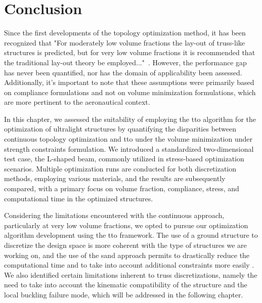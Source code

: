 \section{Conclusion}
Since the first developments of the topology optimization method, it has been recognized that "For moderately low volume fractions the lay-out of truss-like structures is predicted, but for very low volume fractions it is recommended that the traditional lay-out theory be employed..."~. However, the performance gap has never been quantified, nor has the domain of applicability been assessed. Additionally, it's important to note that these assumptions were primarily based on compliance formulations and not on volume minimization formulations, which are more pertinent to the aeronautical context.

In this chapter, we assessed the suitability of employing the \gls{tto} algorithm for the optimization of ultralight structures by quantifying the disparities between continuous topology optimization and \gls{tto} under the volume minimization under strength constraints formulation. We introduced a standardized two-dimensional test case, the L-shaped beam, commonly utilized in stress-based optimization scenarios. Multiple optimization runs are conducted for both discretization methods, employing various materials, and the results are subsequently compared, with a primary focus on volume fraction, compliance, stress, and computational time in the optimized structures.

Considering the limitations encountered with the continuous approach, particularly at very low volume fractions, we opted to pursue our optimization algorithm development using the \acrfull{tto} framework. The use of a ground structure to discretize the design space is more coherent with the type of structures we are working on, and the use of the \gls{sand} approach permits to drastically reduce the computational time and to take into account additional constraints more easily . We also identified certain limitations inherent to truss discretizations, namely the need to take into account the kinematic compatibility of the structure and the local buckling failure mode, which will be addressed in the following chapter.